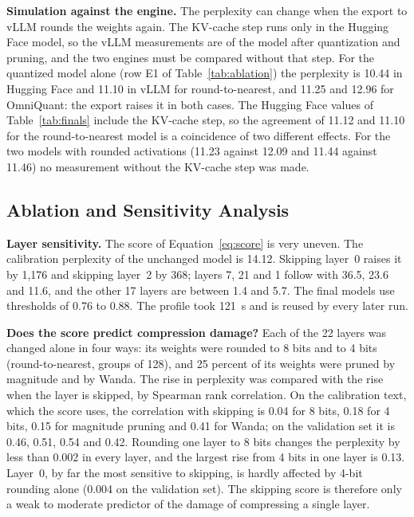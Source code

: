 \documentclass[num-refs]{wiley-article}
\begin{document}
\textbf{Simulation against the engine.} The perplexity can change when the export to vLLM rounds the weights again. The KV-cache step runs only in the Hugging Face model, so the vLLM measurements are of the model after quantization and pruning, and the two engines must be compared without that step. For the quantized model alone (row E1 of Table~\ref{tab:ablation}) the perplexity is 10.44 in Hugging Face and 11.10 in vLLM for round-to-nearest, and 11.25 and 12.96 for OmniQuant: the export raises it in both cases. The Hugging Face values of Table~\ref{tab:finals} include the KV-cache step, so the agreement of 11.12 and 11.10 for the round-to-nearest model is a coincidence of two different effects. For the two models with rounded activations (11.23 against 12.09 and 11.44 against 11.46) no measurement without the KV-cache step was made.

\subsection{Ablation and Sensitivity Analysis}
\label{sec:ablation}

\textbf{Layer sensitivity.} The score of Equation~\ref{eq:score} is very uneven. The calibration perplexity of the unchanged model is 14.12. Skipping layer~0 raises it by 1{,}176 and skipping layer~2 by 368; layers 7, 21 and 1 follow with 36.5, 23.6 and 11.6, and the other 17 layers are between 1.4 and 5.7. The final models use thresholds of 0.76 to 0.88. The profile took 121~s and is reused by every later run.

\textbf{Does the score predict compression damage?} Each of the 22 layers was changed alone in four ways: its weights were rounded to 8 bits and to 4 bits (round-to-nearest, groups of 128), and 25 percent of its weights were pruned by magnitude and by Wanda. The rise in perplexity was compared with the rise when the layer is skipped, by Spearman rank correlation. On the calibration text, which the score uses, the correlation with skipping is 0.04 for 8 bits, 0.18 for 4 bits, 0.15 for magnitude pruning and 0.41 for Wanda; on the validation set it is 0.46, 0.51, 0.54 and 0.42. Rounding one layer to 8 bits changes the perplexity by less than 0.002 in every layer, and the largest rise from 4 bits in one layer is 0.13. Layer~0, by far the most sensitive to skipping, is hardly affected by 4-bit rounding alone (0.004 on the validation set). The skipping score is therefore only a weak to moderate predictor of the damage of compressing a single layer.
\end{document}
